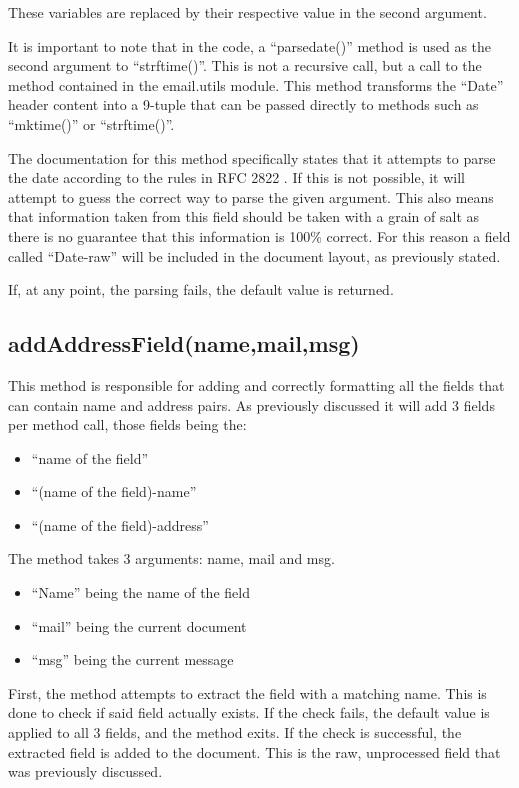 \documentclass[a4paper,english]{report}
\begin{document}
These variables are replaced by their respective value in the second argument.


It is important to note that in the code, a “parsedate()” method is used as the second argument to “strftime()”. This is not a recursive call, but a call to the method contained in the email.utils module. This method transforms the “Date” header content into a 9-tuple that can be passed directly to methods such as “mktime()” or “strftime()”.

The documentation for this method specifically states that it attempts to parse the date according  to the rules in RFC 2822 \cite{RFC2822}. If this is not possible, it will attempt to guess the correct way to parse the given argument. 
This also means that information taken from this field should be taken with a grain of salt as there is no guarantee that this information is 100\% correct. For this reason a field called “Date-raw” will be included in the document layout, as previously stated.

If, at any point, the parsing fails, the default value is returned.

\subsection{addAddressField(name,mail,msg)}

This method is responsible for adding and correctly formatting all the fields that can contain name and address pairs. As previously discussed it will add 3 fields per method call, those fields being the:\ 

\begin{itemize}
\item “name of the field”
\item “(name of the field)-name”
\item “(name of the field)-address”

\end{itemize}
The method takes 3 arguments: name, mail and msg.

\begin{itemize}

\item “Name” being the name of the field 
\item “mail” being the current document 
\item “msg” being the current message  

\end{itemize}

First, the method attempts to extract the field with a matching name. This is done to check if said field actually exists. If the check fails, the default value is applied to all 3 fields, and the method exits.
If the check is successful, the extracted field is added to the document.
This  is the raw, unprocessed field that was previously discussed.
\end{document}
